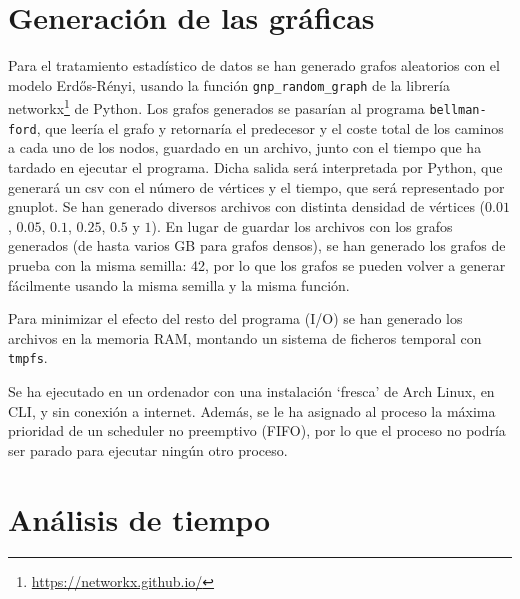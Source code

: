 \documentclass{article}
\begin{document}
\section{Generación de las gráficas}
Para el tratamiento estadístico de datos se han generado grafos aleatorios con el modelo Erdős-Rényi, usando la función \texttt{gnp\_random\_graph} de la librería networkx\footnote{\url{https://networkx.github.io/}} de Python. Los grafos generados se pasarían al programa \texttt{bellman-ford}, que leería el grafo y retornaría el predecesor y el coste total de los caminos a cada uno de los nodos, guardado en un archivo, junto con el tiempo que ha tardado en ejecutar el programa. Dicha salida será interpretada por Python, que generará un csv con el número de vértices y el tiempo, que será representado por gnuplot. Se han generado diversos archivos con distinta densidad de vértices ($0.01$, $0.05$, $0.1$, $0.25$, $0.5$ y $1$). En lugar de guardar los archivos con los grafos generados (de hasta varios GB para grafos densos), se han generado los grafos de prueba con la misma semilla: 42, por lo que los grafos se pueden volver a generar fácilmente usando la misma semilla y la misma función.

Para minimizar el efecto del resto del programa (I/O) se han generado los archivos en la memoria RAM, montando un sistema de ficheros temporal con \texttt{tmpfs}.

Se ha ejecutado en un ordenador con una instalación `fresca' de Arch Linux, en CLI, y sin conexión a internet. Además, se le ha asignado al proceso la máxima prioridad de un scheduler no preemptivo (FIFO), por lo que el proceso no podría ser parado para ejecutar ningún otro proceso.

\newpage
\section{Análisis de tiempo}
\begin{figure}
\centering
{}
\end{figure}
\end{document}
